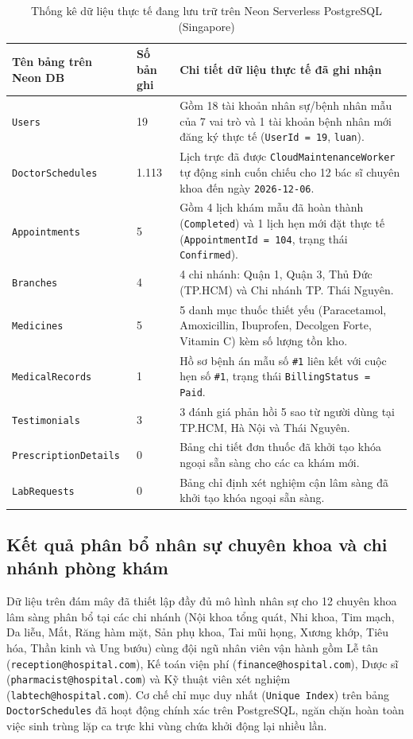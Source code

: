\begin{table}[H]
\caption{Thống kê dữ liệu thực tế đang lưu trữ trên Neon Serverless PostgreSQL (Singapore)}
\label{tab:neon_live_data}
\centering
\begin{tabular}{|p{3.8cm}|p{2.2cm}|p{8.0cm}|}
\hline
\textbf{Tên bảng trên Neon DB} & \textbf{Số bản ghi} & \textbf{Chi tiết dữ liệu thực tế đã ghi nhận} \\
\hline
\texttt{Users} & 19 & Gồm 18 tài khoản nhân sự/bệnh nhân mẫu của 7 vai trò và 1 tài khoản bệnh nhân mới đăng ký thực tế (\texttt{UserId = 19}, \texttt{luan}). \\
\hline
\texttt{DoctorSchedules} & 1.113 & Lịch trực đã được \texttt{CloudMaintenanceWorker} tự động sinh cuốn chiếu cho 12 bác sĩ chuyên khoa đến ngày \texttt{2026-12-06}. \\
\hline
\texttt{Appointments} & 5 & Gồm 4 lịch khám mẫu đã hoàn thành (\texttt{Completed}) và 1 lịch hẹn mới đặt thực tế (\texttt{AppointmentId = 104}, trạng thái \texttt{Confirmed}). \\
\hline
\texttt{Branches} & 4 & 4 chi nhánh: Quận 1, Quận 3, Thủ Đức (TP.HCM) và Chi nhánh TP. Thái Nguyên. \\
\hline
\texttt{Medicines} & 5 & 5 danh mục thuốc thiết yếu (Paracetamol, Amoxicillin, Ibuprofen, Decolgen Forte, Vitamin C) kèm số lượng tồn kho. \\
\hline
\texttt{MedicalRecords} & 1 & Hồ sơ bệnh án mẫu số \texttt{\#1} liên kết với cuộc hẹn số \texttt{\#1}, trạng thái \texttt{BillingStatus = Paid}. \\
\hline
\texttt{Testimonials} & 3 & 3 đánh giá phản hồi 5 sao từ người dùng tại TP.HCM, Hà Nội và Thái Nguyên. \\
\hline
\texttt{PrescriptionDetails} & 0 & Bảng chi tiết đơn thuốc đã khởi tạo khóa ngoại sẵn sàng cho các ca khám mới. \\
\hline
\texttt{LabRequests} & 0 & Bảng chỉ định xét nghiệm cận lâm sàng đã khởi tạo khóa ngoại sẵn sàng. \\
\hline
\end{tabular}
\end{table}

\subsection{Kết quả phân bổ nhân sự chuyên khoa và chi nhánh phòng khám}

Dữ liệu trên đám mây đã thiết lập đầy đủ mô hình nhân sự cho 12 chuyên khoa lâm sàng phân bổ tại các chi nhánh (Nội khoa tổng quát, Nhi khoa, Tim mạch, Da liễu, Mắt, Răng hàm mặt, Sản phụ khoa, Tai mũi họng, Xương khớp, Tiêu hóa, Thần kinh và Ung bướu) cùng đội ngũ nhân viên vận hành gồm Lễ tân (\texttt{reception@hospital.com}), Kế toán viện phí (\texttt{finance@hospital.com}), Dược sĩ (\texttt{pharmacist@hospital.com}) và Kỹ thuật viên xét nghiệm (\texttt{labtech@hospital.com}). Cơ chế chỉ mục duy nhất (\texttt{Unique Index}) trên bảng \texttt{DoctorSchedules} đã hoạt động chính xác trên PostgreSQL, ngăn chặn hoàn toàn việc sinh trùng lặp ca trực khi vùng chứa khởi động lại nhiều lần.

